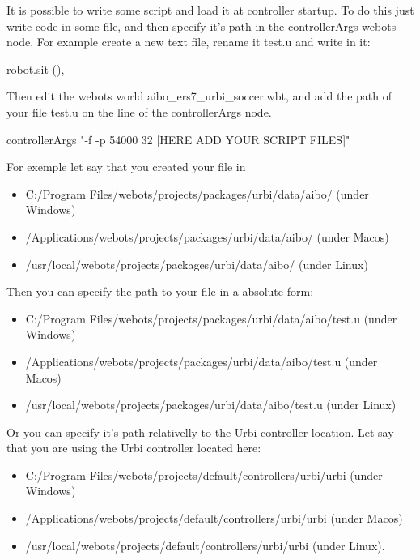 It is possible to write some \urbi script and load it at controller
startup.  To do this just write \urbi code in some file, and then
specify it's path in the controllerArgs webots node.  For example
create a new text file, rename it test.u and write in it:


\begin{urbifixme}
robot.sit (),
\end{urbifixme}

Then edit the webots world aibo\_ers7\_urbi\_soccer.wbt, and add the
path of your file test.u on the line of the controllerArgs node.


\begin{shell}
controllerArgs "-f -p 54000 32 [HERE ADD YOUR SCRIPT FILES]"
\end{shell}

For exemple let say that you created your file in
\begin{itemize}

\item C:/Program Files/webots/projects/packages/urbi/data/aibo/ (under
  Windows)



\item /Applications/webots/projects/packages/urbi/data/aibo/ (under
  Macos)



\item /usr/local/webots/projects/packages/urbi/data/aibo/ (under
  Linux)


\end{itemize}
        Then you can specify the path to your file in a absolute form:
 \begin{itemize}

\item   C:/Program Files/webots/projects/packages/urbi/data/aibo/test.u (under Windows)



\item   /Applications/webots/projects/packages/urbi/data/aibo/test.u (under Macos)



\item   /usr/local/webots/projects/packages/urbi/data/aibo/test.u (under Linux)


\end{itemize}
       Or you can specify it's path relativelly to the Urbi controller location.
      Let say that you are using the Urbi controller located here:
 \begin{itemize}

\item   C:/Program Files/webots/projects/default/controllers/urbi/urbi (under Windows)



\item   /Applications/webots/projects/default/controllers/urbi/urbi (under Macos)



\item   /usr/local/webots/projects/default/controllers/urbi/urbi (under Linux).


\end{itemize}
